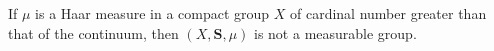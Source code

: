 If $\mu$ is a Haar measure in a compact group $X$ of cardinal number greater than that of the continuum, then $(X,\mathbf{S},\mu)$ is not a measurable group.
